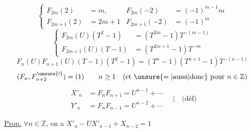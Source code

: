 \[
\left\{\begin{aligned}
F_{2m}(2)&=m,& F_{2m}(-2)&=(-1)^{m-1}m\\
F_{2m+1}(2)&=2m+1 & F_{2m+1}(-2)&=(-1)^m
\end{aligned}\right.
\]
\[
\left\{\begin{aligned}F_{2m}(U)(T^2-1)&=(T^{2m}-1)T^{-(m-1)}\\
F_{2m+1}(U)(T-1)&=(T^{2m+1}-1)T^{-m}\end{aligned}\right.
\]
\[
F_n(U)F_{n+1}(U)(T-1)(T^2-1)=(T^n-1)(T^{n+1}-1)T^{-(n-1)}
\]
\[
(F_n,F_{n+2}^{\unsure{\prime}})=(1)\qquad n\geq1\quad(\text{et }\unsure{=|\text{aussi}|\text{donc}}\text{ pour }n\in\mathbb Z)
\]
\[
\begin{aligned}
X'_n&=F_n F_{n+1}=U^{n-1}+\cdots\\
Y'_n&=F_n F_{n-1}=U^{n-2}+\cdots
\end{aligned}\quad\bigg|\quad\text{(déf)}
\]

\uline{Prop.} $\forall n\in\mathbb Z$, on a $X'_n-UX'_{n-1}+X_{n-2}=1$

